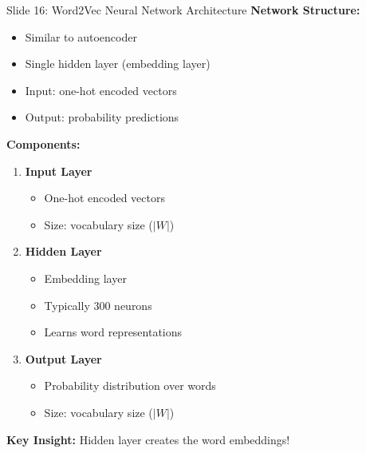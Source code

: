 \documentclass[8pt]{beamer}
\begin{document}
	\begin{frame}{Slide 16: Word2Vec Neural Network Architecture}
		\fontsize{6.5}{7.5}\selectfont
		\textbf{Network Structure:}
		\begin{itemize}
			\item Similar to autoencoder
			\item Single hidden layer (embedding layer)
			\item Input: one-hot encoded vectors
			\item Output: probability predictions
		\end{itemize}
		
		\vspace{0.1cm}
		\textbf{Components:}
		\begin{enumerate}
			\item \textbf{Input Layer}
			\begin{itemize}
				\item One-hot encoded vectors
				\item Size: vocabulary size ($|W|$)
			\end{itemize}
			\item \textbf{Hidden Layer}
			\begin{itemize}
				\item Embedding layer
				\item Typically 300 neurons
				\item Learns word representations
			\end{itemize}
			\item \textbf{Output Layer}
			\begin{itemize}
				\item Probability distribution over words
				\item Size: vocabulary size ($|W|$)
			\end{itemize}
		\end{enumerate}
		
		\textcolor{myblue}{\textbf{Key Insight:}} Hidden layer creates the word embeddings!
	\end{frame}
	
\end{document}
